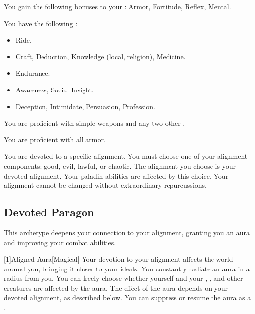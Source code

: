        You gain the following bonuses to your :  Armor,  Fortitude,  Reflex,  Mental.

        You have the following :
        \begin{itemize}
            \item {} Ride.
            \item {} Craft, Deduction, Knowledge (local, religion), Medicine.
            \item {} Endurance.
            \item {} Awareness, Social Insight.
            \item {} Deception, Intimidate, Persuasion, Profession.
        \end{itemize}

        You are proficient with simple weapons and any two other .

        You are proficient with all armor.

        You are devoted to a specific alignment.
        You must choose one of your alignment components: good, evil, lawful, or chaotic.
        The alignment you choose is your devoted alignment.
        Your paladin abilities are affected by this choice.
        Your alignment cannot be changed without extraordinary repurcussions.

    \subsection{Devoted Paragon}
        This archetype deepens your connection to your alignment, granting you an aura and improving your combat abilities.

        [1]{Aligned Aura}[Magical]
        Your devotion to your alignment affects the world around you, bringing it closer to your ideals.
        You constantly radiate an aura in a \areamed radius  from you.
        You can freely choose whether yourself and your , , and other creatures are affected by the aura.
        The effect of the aura depends on your devoted alignment, as described below.
        You can suppress or resume the aura as a .

